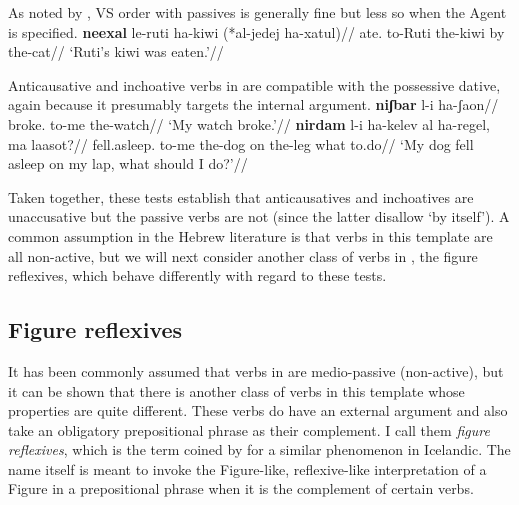 As noted by \citet[148]{shlonsky87}, VS order with passives is generally fine but less so when the Agent is specified.
\ex \begingl
	\gla \textbf{neexal} le-ruti ha-kiwi (*al-jedej ha-xatul)//
	\glb ate. to-Ruti the-kiwi by the-cat//
	\glft `Ruti's kiwi was eaten.'//
	\endgl
\xe
  
Anticausative and inchoative verbs in {\tnif} are compatible with the possessive dative, again because it presumably targets the internal argument.
\pex
	\a 	\begingl
		\gla \textbf{niʃbar} l-i ha-ʃaon//
		\glb broke. to-me the-watch//
		\glft `My watch broke.'//
		\endgl
	\a 	\begingl
		\gla \textbf{nirdam} l-i ha-kelev al ha-regel, ma laasot?//
		\glb fell.asleep. to-me the-dog on the-leg what to.do//
		\glft `My dog fell asleep on my lap, what should I do?'//
		\endgl
\xe

Taken together, these tests establish that anticausatives and inchoatives are unaccusative but the passive verbs are not (since the latter disallow `by itself'). A common assumption in the Hebrew literature is that verbs in this template are all non-active, but we will next consider another class of verbs in {\tnif}, the figure reflexives, which behave differently with regard to these tests.

	\subsection{Figure reflexives} \label{vz:tnif:figrefl}
It has been commonly assumed that verbs in {\tnif} are medio-passive (non-active), but it can be shown that there is another class of verbs in this template whose properties are quite different. These verbs do have an external argument and also take an obligatory prepositional phrase as their complement. I call them \emph{figure reflexives}, which is the term coined by \cite{wood14nllt} for a similar phenomenon in Icelandic. The name itself is meant to invoke the Figure-like, reflexive-like interpretation of a Figure in a prepositional phrase when it is the complement of certain verbs. 

